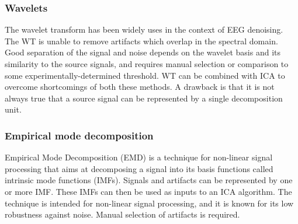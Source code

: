 \documentclass[twoside]{article}
\begin{document}
\subsubsection{Wavelets \cite{eegguidelines} \cite{ieee}}
The wavelet transform has been widely uses in the context of EEG denoising. The WT is unable to remove artifacts which overlap in the spectral domain. Good separation of the signal and noise depends on the wavelet basis and its similarity to the source signals, and requires manual selection or comparison to some experimentally-determined threshold. WT can be combined with ICA to overcome shortcomings of both these methods. A drawback is that it is not always true that a source signal can be represented by a single decomposition unit. 

\subsubsection{Empirical mode decomposition \cite{eegguidelines} \cite{ieee} \cite{emd}}
Empirical Mode Decomposition (EMD) is a technique for non-linear signal processing that aims at decomposing a signal into its basis functions called intrinsic mode functions (IMFs). Signals and artifacts can be represented by one or more IMF. These IMFs can then be used as inputs to an ICA algorithm. The technique is intended for non-linear signal processing, and it is known for its low robustness against noise. Manual selection of artifacts is required. 
\end{document}
